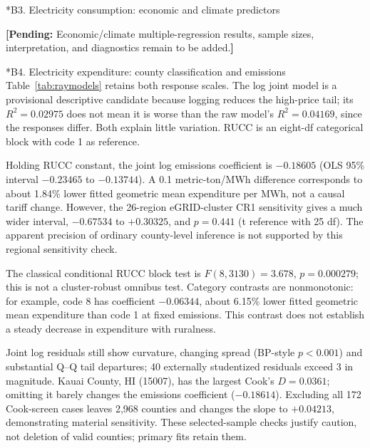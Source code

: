 \documentclass[11pt,letterpaper]{article}
\makeatletter
\renewcommand\subsection{\@startsection{subsection}{2}{0pt}{1.2ex plus .3ex minus .2ex}{.5ex}{\normalfont\normalsize\bfseries}}
\newcommand{\placeholder}[1]{\par{\small\color{blue!55!black}\textbf{[Pending:} #1\textbf{]}}\par}
\makeatother
\begin{document}
\subsection*{B3. Electricity consumption: economic and climate predictors}
\placeholder{Economic/climate multiple-regression results, sample sizes, interpretation, and diagnostics remain to be added.}
\subsection*{B4. Electricity expenditure: county classification and emissions}
Table~\ref{tab:raymodels} retains both response scales. The log joint model is a provisional descriptive candidate because logging reduces the high-price tail; its $R^2=0.02975$ does not mean it is worse than the raw model's $R^2=0.04169$, since the responses differ. Both explain little variation. RUCC is an eight-df categorical block with code 1 as reference.
\begin{table}[!htbp]\centering\small
\caption{Electricity-expenditure candidate models. RSE is measured on the stated response scale; neither RSE nor $R^2$ is directly comparable across scales. RUCC denotes nine unordered categories.}
\label{tab:raymodels}
\end{table}
Holding RUCC constant, the joint log emissions coefficient is $-0.18605$ (OLS 95\% interval $-0.23465$ to $-0.13744$). A 0.1 metric-ton/MWh difference corresponds to about 1.84\% lower fitted geometric mean expenditure per MWh, not a causal tariff change. However, the 26-region eGRID-cluster CR1 sensitivity gives a much wider interval, $-0.67534$ to $+0.30325$, and $p=0.441$ (t reference with 25 df). The apparent precision of ordinary county-level inference is not supported by this regional sensitivity check.

The classical conditional RUCC block test is $F(8,3130)=3.678$, $p=0.000279$; this is not a cluster-robust omnibus test. Category contrasts are nonmonotonic: for example, code 8 has coefficient $-0.06344$, about 6.15\% lower fitted geometric mean expenditure than code 1 at fixed emissions. This contrast does not establish a steady decrease in expenditure with ruralness.

Joint log residuals still show curvature, changing spread (BP-style $p<0.001$) and substantial Q--Q tail departures; 40 externally studentized residuals exceed 3 in magnitude. Kauai County, HI (15007), has the largest Cook's $D=0.0361$; omitting it barely changes the emissions coefficient ($-0.18614$). Excluding all 172 Cook-screen cases leaves 2,968 counties and changes the slope to $+0.04213$, demonstrating material sensitivity. These selected-sample checks justify caution, not deletion of valid counties; primary fits retain them.
\end{document}
